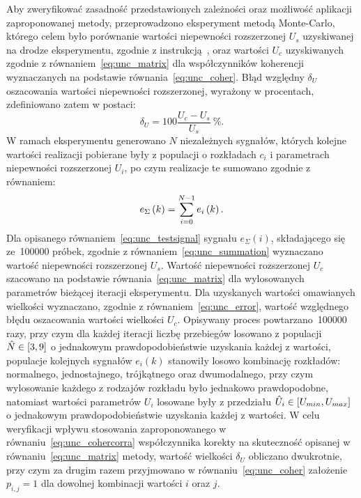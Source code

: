 Aby zweryfikować zasadność przedstawionych zależności oraz możliwość aplikacji zaproponowanej metody, przeprowadzono eksperyment metodą Monte-Carlo, którego celem było porównanie wartości niepewności rozszerzonej $U_{s}$ uzyskiwanej na drodze eksperymentu, zgodnie z instrukcją~\cite{jcgm_montecarlo}, oraz wartości $U_{c}$ uzyskiwanych zgodnie z równaniem~\eqref{eq:unc_matrix} dla współczynników koherencji wyznaczanych na podstawie równania~\eqref{eq:unc_coher}. Błąd względny $\delta_{U}$ oszacowania wartości niepewności rozszerzonej, wyrażony w procentach, zdefiniowano zatem w postaci:
\begin{equation}
\delta_{U} = 100 \frac{U_{c} - U_{s}}{U_{s}}~\unit{\percent} \label{eq:unc_error}.
\end{equation}
W ramach eksperymentu generowano $N$ niezależnych sygnałów, których kolejne wartości realizacji pobierane były z populacji o rozkładach $c_{i}$ i parametrach niepewności rozszerzonej $U_{i}$, po czym realizacje te sumowano zgodnie z równaniem:
\begin{equation}
e_{\Sigma} \left(k\right) = \sum _{i=0} ^{N-1} e_{i} \left(k\right) \label{eq:unc_testsignal}.
\end{equation}
Dla opisanego równaniem~\eqref{eq:unc_testsignal} sygnału $e_{\Sigma}(i)$, składającego się ze~\num{100000} próbek, zgodnie z równaniem~\eqref{eq:unc_summation} wyznaczano wartość niepewności rozszerzonej $U_{s}$. Wartość niepewności rozszerzonej $U_{c}$ szacowano na podstawie równania~\eqref{eq:unc_matrix} dla wylosowanych parametrów bieżącej iteracji eksperymentu. Dla uzyskanych wartości omawianych wielkości wyznaczano, zgodnie z równaniem~\eqref{eq:unc_error}, wartość względnego błędu oszacowania wartości wielkości $U_{c}$. Opisywany proces powtarzano~\num{100000} razy, przy czym dla każdej iteracji liczbę przebiegów losowano z populacji $\hat{N} \in \interval{3}{9}$ o jednakowym prawdopodobieństwie uzyskania każdej z wartości, populacje kolejnych sygnałów $e_{i}(k)$ stanowiły losowo kombinację rozkładów: normalnego, jednostajnego, trójkątnego oraz dwumodalnego, przy czym wylosowanie każdego z rodzajów rozkładu było jednakowo prawdopodobne, natomiast wartości parametrów $U_{i}$ losowane były z przedziału $\hat{U}_{i} \in \interval{U_{min}}{U_{max}}$ o jednakowym prawdopodobieństwie uzyskania każdej z wartości. W celu weryfikacji wpływu stosowania zaproponowanego w równaniu~\eqref{eq:unc_cohercorra} współczynnika korekty na skuteczność opisanej w równaniu~\eqref{eq:unc_matrix} metody, wartość wielkości $\delta_{U}$ obliczano dwukrotnie, przy czym za drugim razem przyjmowano w równaniu~\eqref{eq:unc_coher} założenie $p_{i,j} = 1$ dla dowolnej kombinacji wartości $i$ oraz $j$.

